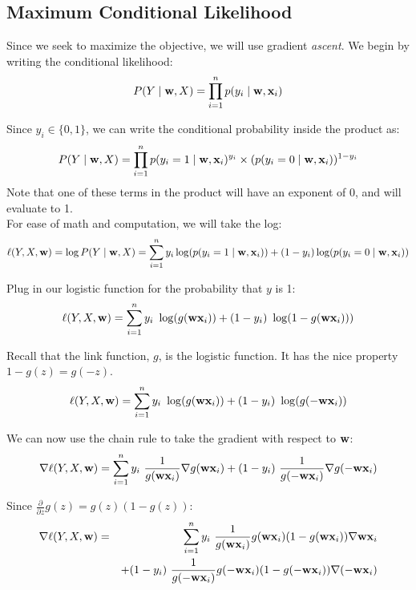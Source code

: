 \documentclass[11pt]{article}
\newcommand{\vw}{{\bf w}}
\newcommand{\vxi}{{\bf x}_i}
\newcommand{\yi}{y_i}
\begin{document}
\subsection{Maximum Conditional Likelihood}
Since we seek to maximize the objective, we will use gradient \emph{ascent}. We begin by writing the conditional likelihood:
\begin{equation}
P(Y \mid \vw, X) = \prod_{i=1}^n{p(\yi \mid \vw, \vxi)}
\end{equation}

Since $\yi \in \{ 0,1 \}$, we can write the conditional probability inside the product as:
\begin{equation}
P(Y \mid \vw, X) = \prod_{i=1}^n{ p(\yi=1 \mid \vw, \vxi)^{\yi} \times (p(\yi=0 \mid \vw, \vxi))^{1-\yi}}
\end{equation}
Note that one of these terms in the product will have an exponent of 0, and will evaluate to 1.\\

For ease of math and computation, we will take the log:
\begin{equation}
\ell(Y,X,\vw) = \log P(Y \mid \vw, X) = \sum_{i=1}^n{ \yi \log(p(\yi=1 \mid \vw, \vxi)) + (1-\yi)\log(p(\yi=0 \mid \vw, \vxi))}
\end{equation}

Plug in our logistic function for the probability that $y$ is 1:
\begin{equation}
\ell(Y,X,\vw) = \sum_{i=1}^n{ y_i\ \log( g(\vw \vxi) ) + (1-y_i)\ \log( 1-g(\vw \vxi) ))}
\end{equation}

Recall that the link function, $g$, is the logistic function. It has the nice property $1 - g(z) = g(-z)$.
\begin{equation}
\ell(Y,X,\vw) = \sum_{i=1}^n{ y_i\ \log( g(\vw \vxi) ) + (1-y_i)\ \log( g(-\vw \vxi) )}
\end{equation}

We can now use the chain rule to take the gradient with respect to $\vw$:
\begin{equation}
\nabla \ell(Y,X,\vw) = \sum_{i=1}^n{
	y_i\ \frac{1}{g(\vw \vxi)} \nabla g(\vw \vxi)
	+ (1-y_i)\ \frac{1}{g(-\vw \vxi)} \nabla g(-\vw \vxi)
}
\end{equation}

Since $\frac{\partial}{\partial z}g(z) = g(z)(1-g(z))$:
\begin{eqnarray}
\nabla \ell(Y,X,\vw) &=& \sum_{i=1}^n 
	 y_i\ \frac{1}{g(\vw \vxi)} g(\vw \vxi) (1-g(\vw \vxi)) \nabla \vw \vxi \\
& & 	+ (1-y_i)\ \frac{1}{g(-\vw \vxi)} g(-\vw \vxi) (1-g(-\vw \vxi)) \nabla (-\vw \vxi)
\end{eqnarray}
\end{document}
